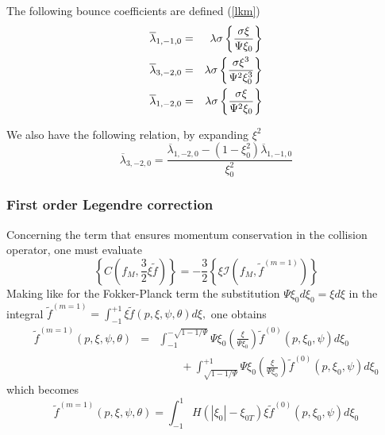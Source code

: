 The following bounce coefficients are defined (\ref{lkm})
\begin{eqnarray}
\overline{\lambda }_{1,-1,0} &=&\lambda \sigma \left\{ \frac{\sigma \xi }{%
\Psi \xi _{0}}\right\} \\
\overline{\lambda }_{3,-2,0} &=&\lambda \sigma \left\{ \frac{\sigma \xi ^{3}%
}{\Psi ^{2}\xi _{0}^{3}}\right\} \\
\overline{\lambda }_{1,-2,0} &=&\lambda \sigma \left\{ \frac{\sigma \xi }{%
\Psi ^{2}\xi _{0}}\right\}
\end{eqnarray}

We also have the following relation, by expanding $\xi ^{2}$%
\begin{equation}
\overline{\lambda }_{3,-2,0}=\frac{\overline{\lambda }_{1,-2,0}-\left( 1-\xi
_{0}^{2}\right) \overline{\lambda }_{1,-1,0}}{\xi _{0}^{2}}
\end{equation}

\subsubsection{First order Legendre correction}

Concerning the term that ensures momentum conservation in the collision
operator, one must evaluate
\begin{equation}
\left\{ C\left( f_{M},\frac{3}{2}\xi \widetilde{f}\right) \right\} =-\frac{3%
}{2}\left\{ \xi \mathcal{I}\left( f_{M},\widetilde{f}^{\left( m=1\right)
}\right) \right\}
\end{equation}
Making like for the Fokker-Planck term the substitution $\Psi \xi
_{0}d\xi _{0}=\xi d\xi $ in the integral $\widetilde{f}^{\left(
m=1\right) }=\int_{-1}^{+1}\xi \widetilde{f}\left( p,\xi ,\psi
,\theta \right) d\xi ,$ one obtains
\begin{align}
\widetilde{f}^{\left( m=1\right) }\left( p,\xi ,\psi ,\theta \right)
&=&\int_{-1}^{-\sqrt{1-1/\Psi }}\Psi \xi _{0}\left( \frac{\xi }{\Psi \xi _{0}}%
\right) \widetilde{f}^{\left( 0\right) }\left( p,\xi _{0},\psi
\right) d\xi _{0}\nonumber\\&&\qquad+\int_{\sqrt{1-1/\Psi
}}^{+1}\Psi \xi _{0}\left( \frac{\xi }{\Psi \xi _{0}}\right)
\widetilde{f}^{\left( 0\right) }\left( p,\xi _{0},\psi \right)
d\xi _{0}
\end{align}
which becomes
\begin{equation}
\widetilde{f}^{\left( m=1\right) }\left( p,\xi ,\psi ,\theta \right)
=\int_{-1}^{1}H\left( \left| \xi _{0}\right| -\xi _{0T}\right) \xi
\widetilde{f}^{\left( 0\right) }\left( p,\xi _{0},\psi \right) d\xi _{0}
\end{equation}

